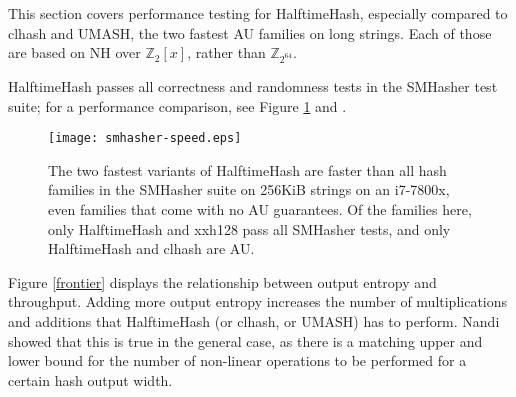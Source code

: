 \documentclass[runningheads]{llncs}
\newcommand{\ints}{\mathbb{Z}}
\begin{document}
This section covers performance testing for HalftimeHash, especially compared to clhash and UMASH, the two fastest AU families on long strings.
Each of those are based on NH over $\ints_2[x]$, rather than $\ints_{2^{64}}$.



HalftimeHash passes all correctness and randomness tests in the SMHasher test suite; for a performance comparison, see Figure \ref{smhasher-speed} and \cite{smhasher}.

\begin{figure}
  \texttt{[image: smhasher-speed.eps]}
\caption{
  \label{smhasher-speed}
    The two fastest variants of HalftimeHash are faster than all hash families in the SMHasher suite on 256KiB strings on an i7-7800x, even families that come with no AU guarantees. \protect\cite{smhasher}
    Of the families here, only HalftimeHash and xxh128 pass all SMHasher tests, and only HalftimeHash and clhash are AU.
}
\end{figure}

Figure \ref{frontier} displays the relationship between output entropy and throughput.
Adding more output entropy increases the number of multiplications and additions that HalftimeHash (or clhash, or UMASH) has to perform.
Nandi showed that this is true in the general case, as there is a matching upper and lower bound for the number of non-linear operations to be performed for a certain hash output width. \cite{ehc-nandi}


\end{document}
